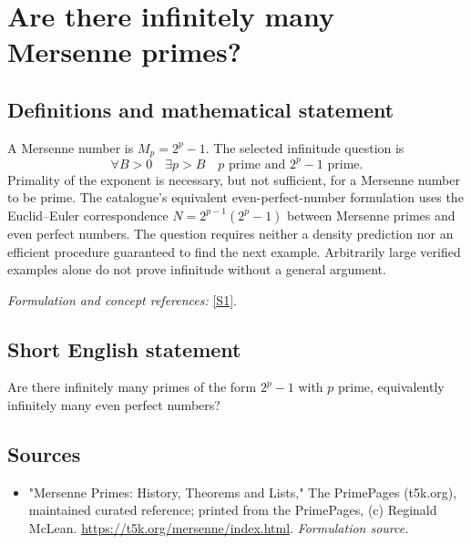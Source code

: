 \documentclass[11pt]{article}
\begin{document}
\section*{\texorpdfstring{Are there infinitely many Mersenne primes?}{Are there infinitely many Mersenne primes?}}\label{26}
\subsection{Definitions and mathematical statement}
A Mersenne number is $M_p=2^p-1$. The selected infinitude question is
\[
 \forall B>0\quad\exists p>B\quad
 p\text{ prime and }2^p-1\text{ prime}.
\]
Primality of the exponent is necessary, but not sufficient, for a Mersenne number to be prime. The catalogue's equivalent even-perfect-number formulation uses the Euclid--Euler correspondence
$N=2^{p-1}(2^p-1)$ between Mersenne primes and even perfect numbers. The question requires neither a density prediction nor an efficient procedure guaranteed to find the next example. Arbitrarily large verified examples alone do not prove infinitude without a general argument.
\par\smallskip\textit{Formulation and concept references:} \href{https://t5k.org/mersenne/index.html}{[S1]}.

\subsection{Short English statement}
Are there infinitely many primes of the form $2^p-1$ with $p$ prime, equivalently infinitely many even perfect numbers?
\subsection{Sources}
\begin{itemize}
\item[S1]"Mersenne Primes: History, Theorems and Lists," The PrimePages (t5k.org), maintained curated reference; printed from the PrimePages, (c) Reginald McLean.
\url{https://t5k.org/mersenne/index.html}.
\textit{Formulation source.}
\end{itemize}
\end{document}
